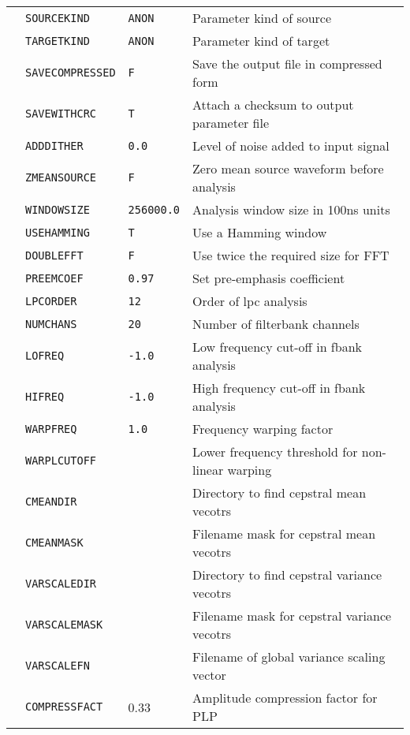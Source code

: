 \begin{center}
\begin{supertabular}{|p{1.4cm}|l|l|p{6.6cm}|}
  & \texttt{SOURCEKIND} & \texttt{ANON} & Parameter kind of source \\ 
  & \texttt{TARGETKIND} & \texttt{ANON} & Parameter kind of target \\ 
  & \texttt{SAVECOMPRESSED} & \texttt{F} & Save the output file in compressed form \\ 
  & \texttt{SAVEWITHCRC} & \texttt{T} & Attach a checksum to output parameter file \\ 
  & \texttt{ADDDITHER} & \texttt{0.0} & Level of noise added to input signal \\  
  & \texttt{ZMEANSOURCE} & \texttt{F} & Zero mean source waveform before analysis \\ 
  & \texttt{WINDOWSIZE} & \texttt{256000.0} & Analysis window size in 100ns units \\ 
  & \texttt{USEHAMMING} & \texttt{T} & Use a Hamming window \\ 
  & \texttt{DOUBLEFFT} & \texttt{F} & Use twice the required size for FFT \\ 
  & \texttt{PREEMCOEF} & \texttt{0.97} & Set pre-emphasis coefficient \\ 
  & \texttt{LPCORDER} &  \texttt{12} &  Order of lpc analysis \\ 
  & \texttt{NUMCHANS} & \texttt{20} & Number of filterbank channels \\ 
  & \texttt{LOFREQ} & \texttt{-1.0} & Low frequency cut-off in fbank analysis \\ 
  & \texttt{HIFREQ}  & \texttt{-1.0} & High frequency cut-off in fbank analysis \\  
  & \texttt{WARPFREQ} & \texttt{1.0} & Frequency warping factor \\ 
  & \texttt{WARPLCUTOFF} &  & Lower frequency threshold for non-linear warping  \\ 
  & \texttt{CMEANDIR} &  & Directory to find cepstral mean vecotrs  \\ 
  & \texttt{CMEANMASK} &  & Filename mask for cepstral mean vecotrs  \\ 
  & \texttt{VARSCALEDIR} &  & Directory to find cepstral variance vecotrs  \\ 
  & \texttt{VARSCALEMASK} &  & Filename mask for cepstral variance vecotrs  \\ 
  & \texttt{VARSCALEFN} &  & Filename of global variance scaling vector \\ 
  & \texttt{COMPRESSFACT} & 0.33 & Amplitude compression factor for PLP \\ \hline


\end{supertabular}
\end{center}
